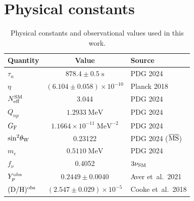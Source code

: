 \documentclass[a4paper,11pt]{article}
\newcommand{\Yp}{Y_p}
\newcommand{\Neff}{N_{\rm eff}}
\newcommand{\GF}{G_{\rm F}}
\newcommand{\sw}{\sin^2\!\theta_{\rm W}}
\begin{document}
\section{Physical constants}\label{app:constants}

\begin{table}[h]
\centering
\caption{Physical constants and observational values used in this work.}\label{tab:constants}
\begin{tabular}{lcl}
\toprule
Quantity & Value & Source \\
\midrule
$\tau_n$ & $878.4 \pm 0.5\;\mathrm{s}$ & PDG 2024 \\
$\eta$ & $(6.104 \pm 0.058)\times 10^{-10}$ & Planck 2018 \\
$\Neff^{\rm SM}$ & 3.044 & PDG 2024 \\
$Q_{np}$ & $1.2933\;\mathrm{MeV}$ & PDG 2024 \\
$\GF$ & $1.1664\times 10^{-11}\;\mathrm{MeV}^{-2}$ & PDG 2024 \\
$\sw$ & 0.23122 & PDG 2024 ($\overline{\rm MS}$) \\
$m_e$ & $0.5110\;\mathrm{MeV}$ & PDG 2024 \\
$f_\nu$ & 0.4052 & $3\nu_{\rm SM}$ \\
$\Yp^{\rm obs}$ & $0.2449 \pm 0.0040$ & Aver et~al.\ 2021 \\
$(\mathrm{D/H})^{\rm obs}$ & $(2.547 \pm 0.029)\times 10^{-5}$ & Cooke et~al.\ 2018 \\
\bottomrule
\end{tabular}
\end{table}
\end{document}
